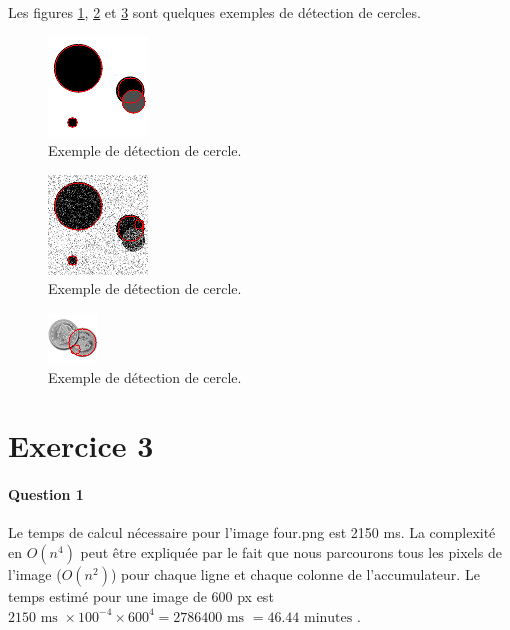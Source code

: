 \documentclass[a4paper,twocolumn]{article}
\begin{document}
Les figures \ref{detection_four}, \ref{detection_fourn} et \ref{detection_coins} sont quelques exemples de détection de cercles.

\begin{figure}[ht]
	\centering\includegraphics{images/detection_four.png}
	\caption{Exemple de détection de cercle.}
	\label{detection_four}
\end{figure}

\begin{figure}[ht]
	\centering\includegraphics{images/detection_fourn.png}
	\caption{Exemple de détection de cercle.}
	\label{detection_fourn}
\end{figure}

\begin{figure}[ht]
	\centering\includegraphics{images/detection_coins.png}
	\caption{Exemple de détection de cercle.}
	\label{detection_coins}
\end{figure}

\section{Exercice 3}

\paragraph{Question 1} Le temps de calcul nécessaire pour l'image four.png est 2150 ms. La complexité en $O(n^4)$ peut être expliquée par le fait que nous parcourons tous les pixels de l'image ($O(n^2)$) pour chaque ligne et chaque colonne de l'accumulateur. Le temps estimé pour une image de 600 px est $2150 \text{ ms } \times 100^{-4} \times 600^4 = 2786400 \text{ ms } = 46.44 \text{ minutes }$.
\end{document}
